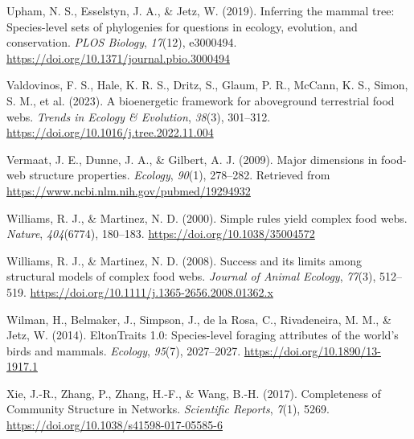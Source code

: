 \documentclass[
]{agujournal2019}
\newlength{\cslhangindent}
\newenvironment{CSLReferences}[2] %
 {\begin{list}{}{%
  \setlength{\itemindent}{0pt}
  \setlength{\leftmargin}{0pt}
  \setlength{\parsep}{0pt}
  \ifodd #1
   \setlength{\leftmargin}{\cslhangindent}
   \setlength{\itemindent}{-1\cslhangindent}
  \fi
  \setlength{\itemsep}{#2\baselineskip}}}
 {\end{list}}
\begin{document}
\begin{CSLReferences}{1}{0}
Upham, N. S., Esselstyn, J. A., \& Jetz, W. (2019). Inferring the mammal
tree: {Species-level} sets of phylogenies for questions in ecology,
evolution, and conservation. \emph{PLOS Biology}, \emph{17}(12),
e3000494. \url{https://doi.org/10.1371/journal.pbio.3000494}

Valdovinos, F. S., Hale, K. R. S., Dritz, S., Glaum, P. R., McCann, K.
S., Simon, S. M., et al. (2023). A bioenergetic framework for
aboveground terrestrial food webs. \emph{Trends in Ecology \&
Evolution}, \emph{38}(3), 301--312.
\url{https://doi.org/10.1016/j.tree.2022.11.004}

Vermaat, J. E., Dunne, J. A., \& Gilbert, A. J. (2009). Major dimensions
in food-web structure properties. \emph{Ecology}, \emph{90}(1),
278--282. Retrieved from
\url{https://www.ncbi.nlm.nih.gov/pubmed/19294932}

Williams, R. J., \& Martinez, N. D. (2000). Simple rules yield complex
food webs. \emph{Nature}, \emph{404}(6774), 180--183.
\url{https://doi.org/10.1038/35004572}

Williams, R. J., \& Martinez, N. D. (2008). Success and its limits among
structural models of complex food webs. \emph{Journal of Animal
Ecology}, \emph{77}(3), 512--519.
\url{https://doi.org/10.1111/j.1365-2656.2008.01362.x}

Wilman, H., Belmaker, J., Simpson, J., de la Rosa, C., Rivadeneira, M.
M., \& Jetz, W. (2014). {EltonTraits} 1.0: {Species-level} foraging
attributes of the world's birds and mammals. \emph{Ecology},
\emph{95}(7), 2027--2027. \url{https://doi.org/10.1890/13-1917.1}

Xie, J.-R., Zhang, P., Zhang, H.-F., \& Wang, B.-H. (2017). Completeness
of {Community Structure} in {Networks}. \emph{Scientific Reports},
\emph{7}(1), 5269. \url{https://doi.org/10.1038/s41598-017-05585-6}

\end{CSLReferences}
\end{document}
